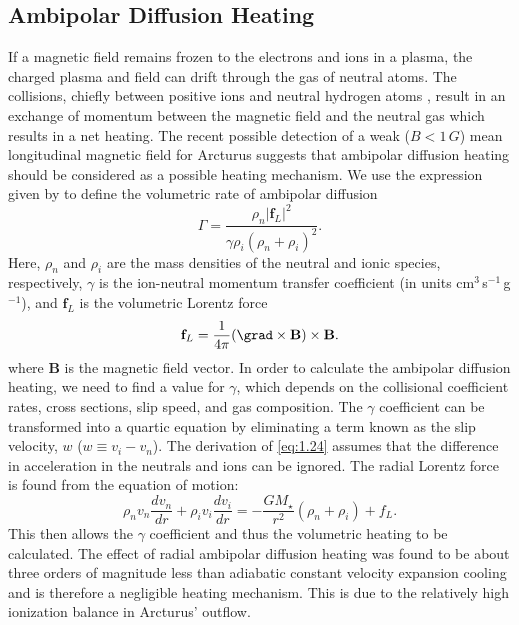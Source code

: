 \subsection{Ambipolar Diffusion Heating}\label{sec:7.4.2}
If a magnetic field remains frozen to the electrons and ions in a plasma, the charged plasma and field can drift through the gas of neutral atoms. The collisions, chiefly between positive ions and neutral hydrogen atoms \citep{spitzer_1978}, result in an exchange of momentum between the magnetic field and the neutral gas which results in a net heating. The recent possible detection of a weak ($B < 1\,G$) mean longitudinal magnetic field for Arcturus \citep{sennhauser_2011} suggests that ambipolar diffusion heating should be considered as a possible heating mechanism.  We use the expression given by \cite{shang_2002} to define the volumetric rate of ambipolar  diffusion 
\begin{equation}\label{eq:1.24}
\Gamma = \frac{\rho _{n}|\mathbf{f}_{L}|^2}{\gamma \rho _{i}(\rho _{n}+\rho _{i})^2}.
\end{equation}
Here, $\rho _{n}$ and $\rho _{i}$ are the mass densities of the neutral and ionic species, respectively, $\gamma$ is the ion-neutral momentum transfer coefficient (in units cm$^3$\,s$^{-1}$\,g$^{-1}$), and $\textbf{f}_{L}$ is the volumetric Lorentz force
\begin{equation}
\textbf{f}_{L}=\frac{1}{4\pi}(\grad \times \textbf{B})\times \textbf{B}.
\end{equation}
where \textbf{B} is the magnetic field vector. In order to calculate the ambipolar diffusion heating, we need to find a value for $\gamma$, which depends on the collisional coefficient rates, cross sections, slip speed, and gas composition. The $\gamma$ coefficient can be transformed into a quartic equation by eliminating a term known as the slip velocity, $w$ ($w\equiv v_{i}-v_{n}$). The derivation of \ref{eq:1.24} assumes that the difference in acceleration in the neutrals and ions can be ignored. The radial Lorentz force is found from the equation of motion:
\begin{equation}
\rho _{n}v_{n}\frac{dv_{n}}{dr}+\rho _{i}v_{i}\frac{dv_{i}}{dr}=-\frac{GM_{\star}}{r^2}(\rho _{n} + \rho _{i})+f_{L}.
\end{equation}
This then allows the $\gamma$ coefficient and thus the volumetric heating to be calculated. The effect of radial ambipolar diffusion heating was found to be about three orders of magnitude less than adiabatic constant velocity expansion cooling and is therefore a negligible heating mechanism. This is due to the relatively high ionization balance in Arcturus' outflow.

